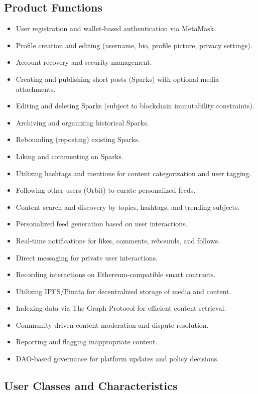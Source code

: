 \documentclass[a4paper,12pt]{article}
\begin{document}
\subsection{Product Functions}
\begin{itemize}
    \item User registration and wallet-based authentication via MetaMask.
    \item Profile creation and editing (username, bio, profile picture, privacy settings).
    \item Account recovery and security management.
    \item Creating and publishing short posts (Sparks) with optional media attachments.
    \item Editing and deleting Sparks (subject to blockchain immutability constraints).
    \item Archiving and organizing historical Sparks.
    \item Rebounding (reposting) existing Sparks.
    \item Liking and commenting on Sparks.
    \item Utilizing hashtags and mentions for content categorization and user tagging.
    \item Following other users (Orbit) to curate personalized feeds.
    \item Content search and discovery by topics, hashtags, and trending subjects.
    \item Personalized feed generation based on user interactions.
    \item Real-time notifications for likes, comments, rebounds, and follows.
    \item Direct messaging for private user interactions.
    \item Recording interactions on Ethereum-compatible smart contracts.
    \item Utilizing IPFS/Pinata for decentralized storage of media and content.
    \item Indexing data via The Graph Protocol for efficient content retrieval.
    \item Community-driven content moderation and dispute resolution.
    \item Reporting and flagging inappropriate content.
    \item DAO-based governance for platform updates and policy decisions.
\end{itemize}

\subsection{User Classes and Characteristics}
\end{document}
